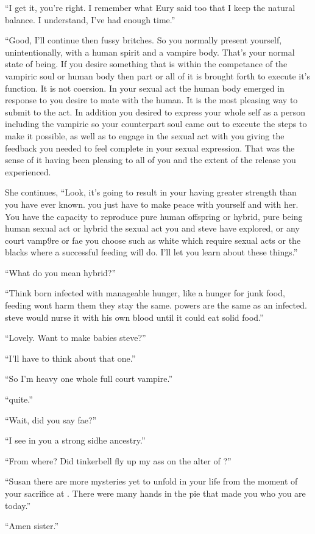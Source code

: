 ``I get it, you're right. I remember what Eury said too that I keep the natural balance. I understand, I've had enough time.''

``Good, I'll continue then fussy britches. So you normally present yourself, unintentionally, with a human spirit and a vampire body. That's your normal state of being. If you desire something that is within the competance of the vampiric soul or human body then part or all of it is brought forth to execute it's function. It is not coersion. In your sexual act the human body emerged in response to you desire to mate with the human. It is the most pleasing way to submit to the act. In addition you desired to express your whole self as a person including the vampiric so your counterpart soul came out to execute the steps to make it possible, as well as to engage in the sexual act with you giving the feedback you needed to feel complete in your sexual expression. That was the sense of it having been pleasing to all of you and the extent of the release you experienced.

She continues, ``Look, it's going to result in your having greater strength than you have ever known. you just have to make peace with yourself and with her. You have the capacity to reproduce pure human offspring or hybrid, pure being human sexual act or hybrid the sexual act you and steve have explored, or any court vamp9re or fae you choose such as white which require sexual acts or the blacks where a successful feeding will do. I'll let you learn about these things.''

``What do you mean hybrid?''

``Think born infected with manageable hunger, like a hunger for junk food, feeding wont harm them they stay the same. powers are the same as an infected. steve would nurse it with his own blood until it could eat solid food.''

``Lovely. Want to make babies steve?''

``I'll have to think about that one.''

``So I'm heavy one whole full court vampire.''

``quite.''

``Wait, did you say fae?''

``I see in you a strong sidhe ancestry.''

``From where? Did tinkerbell fly up my ass on the alter of \chichenitza*?''

``Susan there are more mysteries yet to unfold in your life from the moment of your sacrifice at \chichenitza*. There were many hands in the pie that made you who you are today.''

``Amen sister.''


















